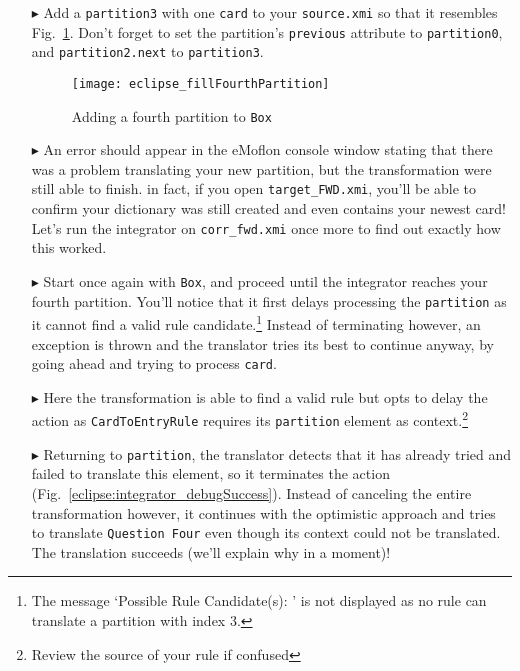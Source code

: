 \begin{itemize}

\item[$\blacktriangleright$] Add a \texttt{partition3} with one \texttt{card} to your \texttt{source.xmi} so that it resembles
Fig.~\ref{eclipse:fourthPartitionStart}. Don't forget to set the partition's \texttt{previous} attribute to \texttt{partition0}, and \texttt{partition2.next} to
\texttt{partition3}.

\begin{figure}[htbp]
\begin{center}
  \texttt{[image: eclipse\_fillFourthPartition]}
  \caption{Adding a fourth partition to \texttt{Box}}
  \label{eclipse:fourthPartitionStart}
\end{center}
\end{figure}

\item[$\blacktriangleright$] An error should appear in the eMoflon console window stating that there was a problem translating your new partition, but the
transformation were still able to finish. in fact, if you open \texttt{target\_FWD.xmi}, you'll be able to confirm your dictionary was still created and even
contains your newest card!
Let's run the integrator on \texttt{corr\_fwd.xmi} once more to find out exactly how this worked.

\item[$\blacktriangleright$] Start once again with \texttt{Box}, and proceed until the integrator reaches your fourth partition. You'll notice that it
first delays processing the \texttt{partition} as it cannot find a valid rule candidate.\footnote{The message `Possible Rule Candidate(s): ' is not displayed
as no rule can translate a partition with index 3.} Instead of terminating however, an exception is thrown and the translator tries its best to continue anyway,
by going ahead and trying to process \texttt{card}.

\item[$\blacktriangleright$] Here the transformation is able to find a valid rule but opts to delay the action as \texttt{CardToEntryRule} requires its
\texttt{partition} element as context.\footnote{Review the source of your rule if confused}

\item[$\blacktriangleright$] Returning to \texttt{partition}, the translator detects that it has already tried and failed to translate this element, so it
terminates the action (Fig.~\ref{eclipse:integrator_debugSuccess}). Instead of canceling the entire transformation however, it continues with the optimistic
approach and tries to translate \texttt{Question Four} even though its context could not be translated. The translation succeeds (we'll explain why in a
moment)!


\end{itemize}
